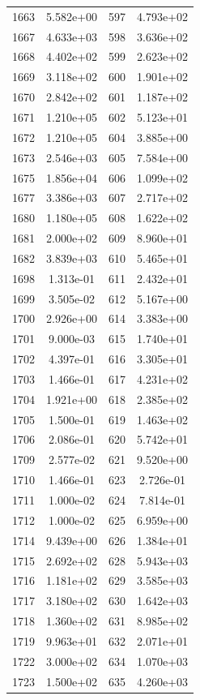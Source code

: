 \documentclass[12pt]{article}
\begin{document}
\begin{longtable}{@{}cccc@{}}
1663 & 5.582e+00 & 597 & 4.793e+02 \\
1667 & 4.633e+03 & 598 & 3.636e+02 \\
1668 & 4.402e+02 & 599 & 2.623e+02 \\
1669 & 3.118e+02 & 600 & 1.901e+02 \\
1670 & 2.842e+02 & 601 & 1.187e+02 \\
1671 & 1.210e+05 & 602 & 5.123e+01 \\
1672 & 1.210e+05 & 604 & 3.885e+00 \\
1673 & 2.546e+03 & 605 & 7.584e+00 \\
1675 & 1.856e+04 & 606 & 1.099e+02 \\
1677 & 3.386e+03 & 607 & 2.717e+02 \\
1680 & 1.180e+05 & 608 & 1.622e+02 \\
1681 & 2.000e+02 & 609 & 8.960e+01 \\
1682 & 3.839e+03 & 610 & 5.465e+01 \\
1698 & 1.313e-01 & 611 & 2.432e+01 \\
1699 & 3.505e-02 & 612 & 5.167e+00 \\
1700 & 2.926e+00 & 614 & 3.383e+00 \\
1701 & 9.000e-03 & 615 & 1.740e+01 \\
1702 & 4.397e-01 & 616 & 3.305e+01 \\
1703 & 1.466e-01 & 617 & 4.231e+02 \\
1704 & 1.921e+00 & 618 & 2.385e+02 \\
1705 & 1.500e-01 & 619 & 1.463e+02 \\
1706 & 2.086e-01 & 620 & 5.742e+01 \\
1709 & 2.577e-02 & 621 & 9.520e+00 \\
1710 & 1.466e-01 & 623 & 2.726e-01 \\
1711 & 1.000e-02 & 624 & 7.814e-01 \\
1712 & 1.000e-02 & 625 & 6.959e+00 \\
1714 & 9.439e+00 & 626 & 1.384e+01 \\
1715 & 2.692e+02 & 628 & 5.943e+03 \\
1716 & 1.181e+02 & 629 & 3.585e+03 \\
1717 & 3.180e+02 & 630 & 1.642e+03 \\
1718 & 1.360e+02 & 631 & 8.985e+02 \\
1719 & 9.963e+01 & 632 & 2.071e+01 \\
1722 & 3.000e+02 & 634 & 1.070e+03 \\
1723 & 1.500e+02 & 635 & 4.260e+03 \\

\end{longtable}
\end{document}
